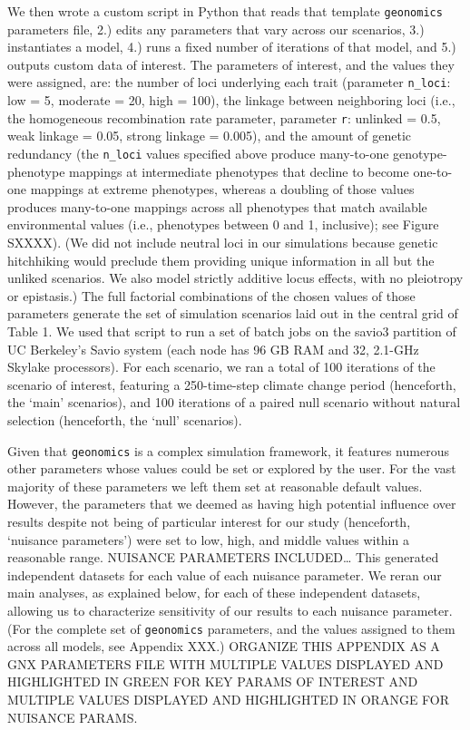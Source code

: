 \documentclass[9pt,twocolumn,twoside,lineno]{pnas-new}
\begin{document}
{We then wrote a custom script in Python that reads that template \texttt{geonomics}
parameters file, 2.) edits any parameters that vary 
across our scenarios, 3.) instantiates a model, 4.) runs a fixed number of iterations 
of that model, and 5.) outputs custom data of interest. The parameters of interest, 
and the values they were assigned, are: the number of loci underlying each trait 
(parameter \texttt{n\_loci}: low = 5, moderate = 20, high = 100), the linkage between 
neighboring loci (i.e., the homogeneous recombination rate parameter, parameter \texttt{r}: unlinked = 
0.5, weak linkage = 0.05, strong linkage = 0.005), and the amount of genetic redundancy
(the \texttt{n\_loci} values specified above produce many-to-one genotype-phenotype mappings
at intermediate phenotypes that decline to become one-to-one mappings at extreme phenotypes,
whereas a doubling of those values produces many-to-one mappings across
all phenotypes that match available environmental values (i.e., phenotypes between 0 and 1, inclusive); see Figure SXXXX).
(We did not include neutral loci in our simulations because genetic
hitchhiking would preclude them providing unique information
in all but the unliked scenarios. We also model strictly additive locus effects,
with no pleiotropy or epistasis.)
The full factorial combinations
of the chosen values of those parameters generate the set
of simulation scenarios laid out in
the central grid of Table 1. We used that script to run a set of batch jobs on the 
savio3 partition of UC Berkeley’s Savio system (each node has 96 GB RAM and 32, 
2.1-GHz Skylake processors). For each scenario, we ran a total of 100 iterations of 
the scenario of interest, featuring a 250-time-step climate change period (henceforth, 
the ‘main’ scenarios), and 100 iterations of a paired null scenario without natural 
selection (henceforth, the ‘null’ scenarios). 


Given that \texttt{geonomics} is a complex simulation framework, it features numerous other 
parameters whose values could be set or explored by the user. For the vast majority of
these parameters we left them set at reasonable default values. However, the 
parameters that we deemed as having high potential influence over results despite not 
being of particular interest for our study (henceforth, ‘nuisance parameters’) were 
set to low, high, and middle values within a reasonable range. NUISANCE PARAMETERS 
INCLUDED… This generated independent datasets for each value of each nuisance 
parameter. We reran our main analyses, as explained below, for each of these 
independent datasets, allowing us to characterize sensitivity of our results to each 
nuisance parameter. (For the complete set of \texttt{geonomics} parameters, and the values 
assigned to them across all models, see Appendix XXX.) ORGANIZE THIS APPENDIX AS A GNX
PARAMETERS FILE WITH MULTIPLE VALUES DISPLAYED AND HIGHLIGHTED IN GREEN FOR KEY PARAMS
OF INTEREST AND MULTIPLE VALUES DISPLAYED AND HIGHLIGHTED IN ORANGE FOR NUISANCE PARAMS.


}
\end{document}
